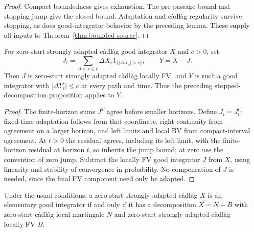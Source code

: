 \begin{proof}
Compact boundedness gives exhaustion. The pre-passage bound and stopping
jump give the closed bound. Adaptation and c\`adl\`ag regularity survive
stopping, as does good-integrator behavior by the preceding lemma.
These supply all inputs to Theorem~\ref{thm:bounded-source}.
\end{proof}
\begin{proposition}
For zero-start strongly adapted c\`adl\`ag good integrator $X$ and $c>0$, set
\[
 J_t=\sum_{0<s\leq t}\Delta X_s1_{\{|\Delta X_s|>c\}},\qquad Y=X-J.
\]
Then $J$ is zero-start strongly adapted c\`adl\`ag locally FV, and $Y$ is
such a good integrator with $|\Delta Y_t|\leq c$ at every path and time.
Thus the preceding stopped-decomposition proposition applies to $Y$.
\end{proposition}
\begin{proof}
The finite-horizon sums $J^T$ agree before smaller horizons.
Define $J_t=J^t_t$; fixed-time adaptation follows from that coordinate,
right continuity from agreement on a larger horizon, and left limits and
local BV from compact-interval agreement. At $t>0$ the residual agrees,
including its left limit, with the finite-horizon residual at horizon $t$,
so inherits the jump bound; at zero use the convention of zero jump.
Subtract the locally FV good integrator $J$ from $X$, using linearity and
stability of convergence in probability. No compensation of $J$ is needed,
since the final FV component need only be adapted.
\end{proof}
\begin{theorem}\label{thm:regular-gi-decomposition}
Under the usual conditions, a zero-start strongly adapted c\`adl\`ag $X$
is an elementary good integrator if and only if it has a decomposition
$X=N+B$ with zero-start c\`adl\`ag local martingale $N$ and zero-start
strongly adapted c\`adl\`ag locally FV $B$.
\end{theorem}
